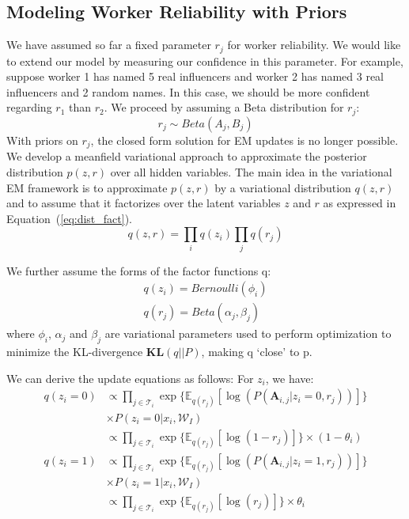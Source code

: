 \documentclass{article}
\begin{document}
\subsection{Modeling Worker Reliability with Priors}
We have assumed so far a fixed parameter $r_j$ for worker reliability. 
We would like to extend our model by measuring our confidence in this parameter.
For example, suppose worker 1 has named 5 real influencers and worker 2 has named 
3 real influencers and 2 random names. In this case, we should be more confident
regarding $r_1$ than $r_2$. We proceed by assuming a Beta distribution for $r_j$:
\begin{equation}
		r_j \sim Beta(A_j,B_j)
		\label{eq:rj_dist}
\end{equation}
With priors on $r_j$, the closed form solution  for EM updates is no longer possible.
We develop a meanfield variational approach to approximate the posterior distribution 
$p(z,r)$ over all hidden variables. 
The main idea in the variational EM framework \cite{bayes2008variational} is to approximate $p(z,r)$ 
by a variational distribution $q(z,r)$ and to assume that it factorizes over
the latent variables $z$ and $r$ as expressed in Equation~(\ref{eq:dist_fact}).
\begin{equation}
	q(z,r)=\prod_{i} q(z_i) \prod_j q(r_j)
	\label{eq:dist_fact}
\end{equation}

We further assume the forms of the factor functions q:
\begin{align}
	q(z_i)=Bernoulli(\phi_i) \\
	q(r_j)=Beta(\alpha_j,\beta_j)
\end{align}
where $\phi_i$, $\alpha_j$ and $\beta_j$ are variational parameters
used to perform optimization to minimize the KL-divergence $\mathbf{KL}(q||P)$, 
making q ‘close’ to p.

We can derive the update equations as follows:
For $z_i$, we have:
\begin{align}
    q(z_i=0)    &\propto \prod_{j \in \mathcal{T}_{i}} \exp{\{\mathbb{E}_{q(r_j)}[\log (P(\mathbf{A}_{i,j}|z_i=0,r_j))]\}}				\nonumber \\ &\times P(z_i=0|x_i, \mathcal{W}_I)  \nonumber \\
                &\propto \prod_{j \in \mathcal{T}_{i}} \exp{\{\mathbb{E}_{q(r_j)}[\log (1-r_j)]\}}\times (1-\theta_i) \nonumber \\
    q(z_i=1)    &\propto \prod_{j \in \mathcal{T}_{i}} \exp{\{\mathbb{E}_{q(r_j)}[\log (P(\mathbf{A}_{i,j}|z_i=1,r_j))]\}}\nonumber \\ &\times P(z_i=1|x_i, \mathcal{W}_I)   \nonumber \\
                &\propto \prod_{j \in \mathcal{T}_{i}} \exp{\{\mathbb{E}_{q(r_j)}[\log (r_j)]\}}\times \theta_i 
\label{eq:q_two_poss}                
\end{align}
\end{document}
